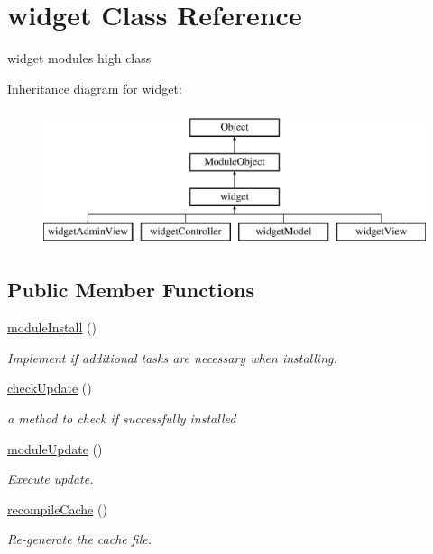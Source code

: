 \hypertarget{classwidget}{}\section{widget Class Reference}
\label{classwidget}


widget module\textquotesingle{}s high class  


Inheritance diagram for widget\+:\begin{figure}[H]
\begin{center}
\leavevmode
\includegraphics[height=4.000000cm]{classwidget}
\end{center}
\end{figure}
\subsection*{Public Member Functions}
\begin{DoxyCompactItemize}
\item 
\hyperlink{classwidget_ae5a0f29ef320000b10196c8ce3d1bcdc}{module\+Install} ()
\begin{DoxyCompactList}\small\item\em Implement if additional tasks are necessary when installing. \end{DoxyCompactList}\item 
\hyperlink{classwidget_a40ce2841fc3aa0dade2ce5609c08ea9e}{check\+Update} ()
\begin{DoxyCompactList}\small\item\em a method to check if successfully installed \end{DoxyCompactList}\item 
\hyperlink{classwidget_ae12b6e9bc84250539e3aa09c1e1e6f77}{module\+Update} ()
\begin{DoxyCompactList}\small\item\em Execute update. \end{DoxyCompactList}\item 
\hyperlink{classwidget_a958eb4fd79b5c9834f04d866bc6b5d02}{recompile\+Cache} ()
\begin{DoxyCompactList}\small\item\em Re-\/generate the cache file. \end{DoxyCompactList}\end{DoxyCompactItemize}
